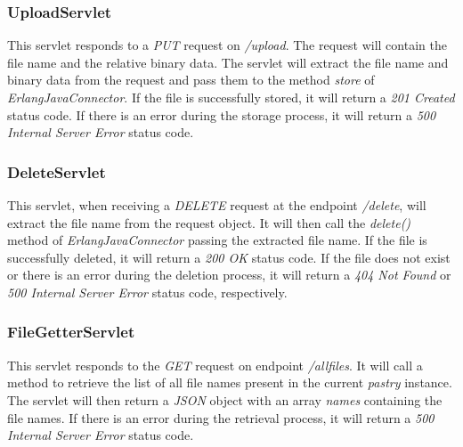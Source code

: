 \documentclass{article}
\begin{document}
\subsubsection{UploadServlet}
This servlet responds to a \textit{PUT} request on \textit{/upload}. The request will contain the file name and the relative binary data. The servlet will extract the file name and binary data from the request and pass them to the method \textit{store} of \textit{ErlangJavaConnector}. If the file is successfully stored, it will return a \textit{201 Created} status code. If there is an error during the storage process, it will return a \textit{500 Internal Server Error} status code.

\subsubsection{DeleteServlet}
This servlet, when receiving a \textit{DELETE} request at the endpoint \textit{/delete}, will extract the file name from the request object. It will then call the \textit{delete()} method of \textit{ErlangJavaConnector} passing the extracted file name. If the file is successfully deleted, it will return a \textit{200 OK} status code. If the file does not exist or there is an error during the deletion process, it will return a \textit{404 Not Found} or \textit{500 Internal Server Error} status code, respectively.

\subsubsection{FileGetterServlet}
This servlet responds to the \textit{GET} request on endpoint \textit{/allfiles}. It will call a method to retrieve the list of all file names present in the current \textit{pastry} instance. The servlet will then return a \textit{JSON} object with an array \textit{names} containing the file names. If there is an error during the retrieval process, it will return a \textit{500 Internal Server Error} status code.
\end{document}
